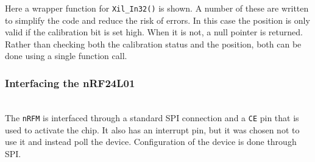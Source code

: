 Here a wrapper function for \texttt{Xil\_In32()} is shown.
A number of these are written to simplify the code and reduce the risk of errors.
In this case the position is only valid if the calibration bit is set high.
When it is not, a null pointer is returned.
Rather than checking both the calibration status and the position, both can be done using a single function call.

\subsubsection{Interfacing the nRF24L01} %
\label{ssubs:nrf24l01}
~\\
The \texttt{nRFM} is interfaced through a standard SPI connection and a \texttt{CE} pin that is used to activate the chip. 
It also has an interrupt pin, but it was chosen not to use it and instead poll the device. 
Configuration of the device is done through SPI.

